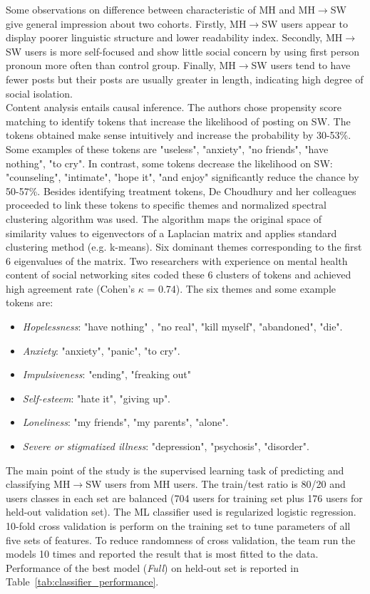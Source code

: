 Some observations on difference between characteristic of MH and  MH$\rightarrow$SW give general impression about two cohorts. Firstly, MH$\rightarrow$SW users appear to display poorer linguistic structure and lower readability index. Secondly,  MH$\rightarrow$SW users is more self-focused and show little social concern by using first person pronoun more often than control group. Finally, MH$\rightarrow$SW users tend to have fewer posts but their posts are usually greater in length, indicating high degree of social isolation.\\
Content analysis entails causal inference. The authors chose propensity score matching to identify tokens that increase the likelihood of posting on SW. The tokens obtained make sense intuitively and increase the probability by 30-53\%. Some examples of these tokens are "useless", "anxiety", "no friends", "have nothing", "to cry". In contrast, some tokens decrease the likelihood on SW: "counseling", "intimate", "hope it", "and enjoy" significantly reduce the chance by 50-57\%. Besides identifying treatment tokens,  De Choudhury and her colleagues proceeded to link these tokens to specific themes and normalized spectral clustering algorithm was used. The algorithm maps the original space of similarity values to eigenvectors of a Laplacian matrix and applies standard clustering method (e.g. k-means). Six dominant themes corresponding to the first 6 eigenvalues of the matrix. Two researchers with experience on mental health content of social networking sites coded these 6 clusters of tokens and achieved high agreement rate (Cohen's $\kappa$ = 0.74). The six themes and some example tokens are:
\begin{itemize}
\item \textit{Hopelessness}: "have nothing" , "no real", "kill myself", "abandoned", "die".
\item \textit{Anxiety}: "anxiety", "panic", "to cry".
\item \textit{Impulsiveness}: "ending", "freaking out"
\item \textit{Self-esteem}: "hate it", "giving up".
\item \textit{Loneliness}: "my friends", "my parents", "alone".
\item \textit{Severe or stigmatized illness}: "depression", "psychosis", "disorder".
\end{itemize}
The main point of the study is the supervised learning task of predicting and classifying MH$\rightarrow$SW users from MH users. The train/test ratio is 80/20 and users classes in each set are balanced (704 users for training set plus 176 users for held-out validation set). The ML classifier used is regularized logistic regression. 10-fold cross validation is perform on the training set to tune parameters of all five sets of features. To reduce randomness of cross validation, the team run the models 10 times and reported the result that is most fitted to the data. Performance of the best model (\textit{Full}) on held-out set is reported in Table~\ref{tab:classifier_performance}.\\
